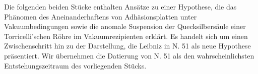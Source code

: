 Die folgenden beiden St\"{u}cke enthalten Ans\"{a}tze zu einer Hypothese, die das Ph\"{a}nomen des Aneinanderhaftens von Adh\"{a}sionsplatten unter Vakuumbedingungen sowie die anomale Suspension  der Quecksilbers\"{a}ule einer Torricelli'schen R\"{o}hre im Vakuumrezipienten erkl\"{a}rt. Es handelt sich um einen Zwischenschritt hin zu der Darstellung, die Leibniz in N. 51 als neue Hypothese pr\"{a}sentiert. Wir \"{u}bernehmen die Datierung von N. 51 als den wahrscheinlichsten Entstehungszeitraum des vorliegenden St\"{u}cks.